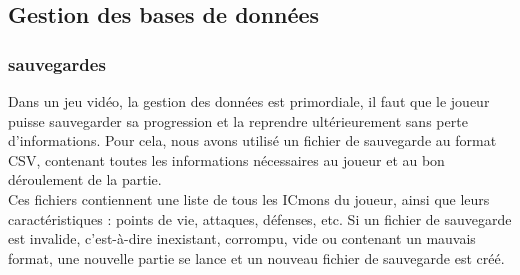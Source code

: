 \documentclass[12pt,a4paper, twoside]{article}
\begin{document}
\subsection{Gestion des bases de données}
    \subsubsection{sauvegardes}
    Dans un jeu vidéo, la gestion des données est primordiale, il faut que le joueur puisse sauvegarder sa progression et la reprendre ultérieurement sans perte d'informations.
     Pour cela, nous avons utilisé un fichier de sauvegarde au format CSV, contenant toutes les informations nécessaires au joueur et au bon déroulement de la partie.\\
     Ces fichiers contiennent une liste de tous les ICmons du joueur, ainsi que leurs caractéristiques : points de vie, attaques, défenses, etc.
     Si un fichier de sauvegarde est invalide, c'est-à-dire inexistant, corrompu, vide ou contenant un mauvais format, une nouvelle partie se lance et un nouveau fichier de sauvegarde est créé.\\
\end{document}
